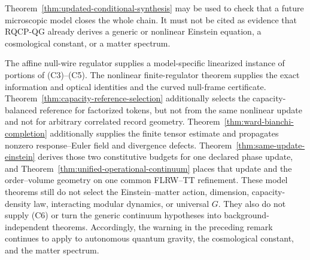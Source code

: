 \begin{remark}
Theorem~\ref{thm:updated-conditional-synthesis} may be used to check that a
future microscopic model closes the whole chain.  It must not be cited as
evidence that RQCP-QG already derives a generic or nonlinear Einstein
equation, a cosmological constant, or a matter spectrum.
\end{remark}

The affine null-wire regulator supplies a model-specific linearized instance
of portions of (C3)--(C5).  The nonlinear finite-regulator theorem supplies
the exact information and optical identities and the curved null-frame
certificate.  Theorem~\ref{thm:capacity-reference-selection} additionally
selects the capacity-balanced reference for factorized tokens, but not from
the same nonlinear update and not for arbitrary correlated record geometry.
Theorem~\ref{thm:ward-bianchi-completion} additionally supplies the finite
tensor estimate and propagates nonzero response--Euler field and divergence
defects.  Theorem~\ref{thm:same-update-einstein} derives those two
constitutive budgets for one declared phase update, and
Theorem~\ref{thm:unified-operational-continuum} places that update and the
order--volume geometry on one common FLRW--TT refinement.  These model
theorems still do not select the Einstein--matter action, dimension,
capacity-density law, interacting modular dynamics, or universal \(G\).
They also do not supply (C6) or turn the generic continuum hypotheses into
background-independent theorems.  Accordingly, the warning in the preceding
remark continues to apply to autonomous quantum gravity, the cosmological
constant, and the matter spectrum.

